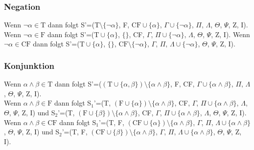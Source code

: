 \subsubsection{Negation}
Wenn $\neg\alpha\in\textrm{T}$ dann folgt S'=($\textrm{T}\setminus\lbrace\neg\alpha\rbrace$, F, $\textrm{CF}\cup\lbrace\alpha\rbrace$, $\Gamma\cup\lbrace\neg\alpha\rbrace$, $\Pi$, $\Lambda$, $\Theta$, $\Psi$, Z, I).\\
Wenn $\neg\alpha\in\textrm{F}$ dann folgt S'=($\textrm{T}\cup\lbrace\alpha\rbrace$, $\lbrace\rbrace$, CF, $\Gamma$, $\Pi\cup\lbrace\neg\alpha\rbrace$, $\Lambda$, $\Theta$, $\Psi$, Z, I).
Wenn $\neg\alpha\in\textrm{CF}$ dann folgt S'=($\textrm{T}\cup\lbrace\alpha\rbrace$, $\lbrace\rbrace$, $\textrm{CF}\setminus\lbrace\neg\alpha\rbrace$, $\Gamma$, $\Pi$, $\Lambda\cup\lbrace\neg\alpha\rbrace$, $\Theta$, $\Psi$, Z, I).

\subsubsection{Konjunktion}
Wenn $\alpha\wedge\beta\in\textrm{T}$ dann folgt S'=($(\textrm{T}\cup\lbrace\alpha,\beta\rbrace)\setminus\lbrace\alpha\wedge\beta\rbrace$, F, CF, $\Gamma\cup\lbrace\alpha\wedge\beta\rbrace$, $\Pi$, $\Lambda$, $\Theta$, $\Psi$, Z, I).\\
Wenn $\alpha\wedge\beta\in\textrm{F}$ dann folgt S$_{1}$'=(T, $(\textrm{F}\cup\lbrace\alpha\rbrace)\setminus\lbrace\alpha\wedge\beta\rbrace$, CF, $\Gamma$, $\Pi\cup\lbrace\alpha\wedge\beta\rbrace$, $\Lambda$, $\Theta$, $\Psi$, Z, I) und S$_{2}$'=(T, $(\textrm{F}\cup\lbrace\beta\rbrace)\setminus\lbrace\alpha\wedge\beta\rbrace$, CF, $\Gamma$, $\Pi\cup\lbrace\alpha\wedge\beta\rbrace$, $\Lambda$, $\Theta$, $\Psi$, Z, I). \\
Wenn $\alpha\wedge\beta\in\textrm{CF}$ dann folgt S$_{1}$'=(T, F, $(\textrm{CF}\cup\lbrace\alpha\rbrace)\setminus\lbrace\alpha\wedge\beta\rbrace$, $\Gamma$, $\Pi$, $\Lambda\cup\lbrace\alpha\wedge\beta\rbrace$, $\Theta$, $\Psi$, Z, I) und S$_{2}$'=(T, F, $(\textrm{CF}\cup\lbrace\beta\rbrace)\setminus\lbrace\alpha\wedge\beta\rbrace$, $\Gamma$, $\Pi$, $\Lambda\cup\lbrace\alpha\wedge\beta\rbrace$, $\Theta$, $\Psi$, Z, I).

